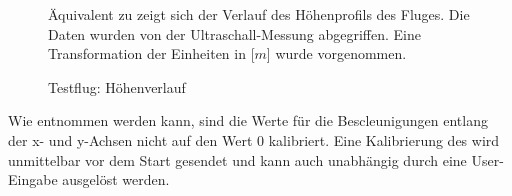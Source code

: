 \begin{figure}[ht!]
\vspace{0.25cm}
\begin{center}
\caption{Testflug: Höhenverlauf}
\label{fig:FlightHeight}
\end{center}

\vspace{0.25cm}
Äquivalent zu  zeigt sich der Verlauf des Höhenprofils des Fluges. Die Daten wurden von der Ultraschall-Messung abgegriffen. Eine Transformation der Einheiten in [$m$] wurde vorgenommen.
\end{figure}


















\FloatBarrier
{}









Wie  entnommen werden kann, sind die Werte für die Bescleunigungen entlang der x- und y-Achsen nicht auf den Wert 0 kalibriert. Eine Kalibrierung des \Quad[s] wird unmittelbar vor dem Start gesendet und kann auch unabhängig durch eine User-Eingabe ausgelöst werden.

